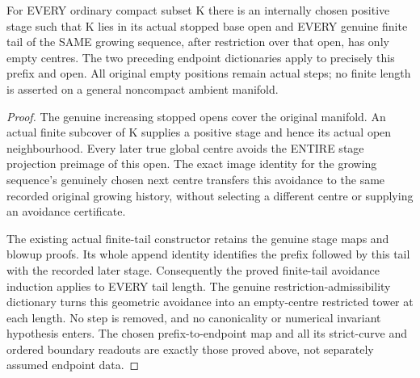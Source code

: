 \begin{theorem}
\label{hir:sharp-actual-curve-growing-compact-open-empty-tails}
\leanok
For EVERY ordinary compact subset K there is an internally chosen positive
stage such that K lies in its actual stopped base open and EVERY genuine
finite tail of the SAME growing sequence, after restriction over that
open, has only empty centres. The two preceding endpoint dictionaries
apply to precisely this prefix and open. All original empty positions
remain actual steps; no finite length is asserted on a general noncompact
ambient manifold.
\end{theorem}
\begin{proof}
The genuine increasing stopped opens cover the original manifold. An
actual finite subcover of K supplies a positive stage and hence its
actual open neighbourhood. Every later true global centre avoids the
ENTIRE stage projection preimage of this open. The exact image identity
for the growing sequence's genuinely chosen next centre transfers this
avoidance to the same recorded original growing history, without selecting
a different centre or supplying an avoidance certificate.

The existing actual finite-tail constructor retains the genuine stage
maps and blowup proofs. Its whole append identity identifies the prefix
followed by this tail with the recorded later stage. Consequently the
proved finite-tail avoidance induction applies to EVERY tail length.
The genuine restriction-admissibility dictionary turns this geometric
avoidance into an empty-centre restricted tower at each length. No step
is removed, and no canonicality or numerical invariant hypothesis enters.
The chosen prefix-to-endpoint map and all its strict-curve and ordered
boundary readouts are exactly those proved above, not separately assumed
endpoint data.
\end{proof}
